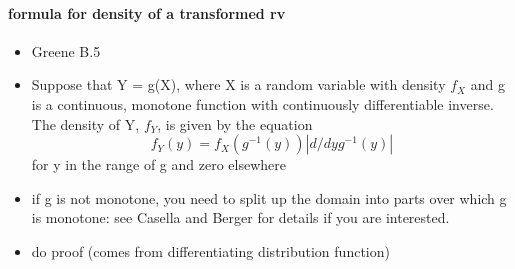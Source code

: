 \paragraph{formula for density of a transformed rv}
\label{sec-3-5-3}

\begin{itemize}
\item Greene B.5
\item Suppose that Y = g(X), where X is a random variable with density
        $f_X$ and g is a continuous, monotone function with continuously
        differentiable inverse.  The
        density of Y, $f_Y$, is given by the equation
        \[ f_Y(y) = f_X(g^{-1}(y)) | d/dy g^{-1}(y) | \]
        for y in the range of g and zero elsewhere
\item if g is not monotone, you need to split up the domain into parts
        over which g is monotone: see Casella and Berger for details if
        you are interested.
\item do proof (comes from differentiating distribution function)
\end{itemize}

